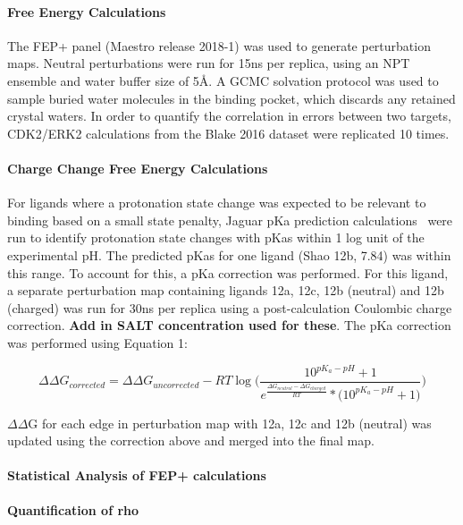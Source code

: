 \documentclass[9pt,lineno]{elife-modified} %
\begin{document}
\paragraph{Free Energy Calculations}
The FEP+ panel (Maestro release 2018-1) was used to generate perturbation maps. Neutral perturbations were run for 15ns per replica, using an NPT ensemble and water buffer size of 5\AA. A GCMC solvation protocol was used to sample buried water molecules in the binding pocket, which discards any retained crystal waters. In order to quantify the correlation in errors between two targets, CDK2/ERK2 calculations from the Blake 2016 dataset were replicated 10 times. 

\paragraph{Charge Change Free Energy Calculations} 
For ligands where a protonation state change was expected to be relevant to binding based on a small state penalty, Jaguar pKa prediction calculations~\citep{Bochevarov2013-bn} were run to identify protonation state changes with pKas within 1 log unit of the experimental pH. The predicted pKas for one ligand (Shao 12b, 7.84) was within this range. To account for this, a pKa correction was performed. For this ligand, a separate perturbation map containing ligands 12a, 12c, 12b (neutral) and 12b (charged) was run for 30ns per replica using a post-calculation Coulombic charge correction. \textbf{Add in SALT concentration used for these}. The pKa correction was performed using Equation 1: 

\begin{equation}\label{eq1}
\Delta\Delta G_{corrected} = \Delta\Delta G_{uncorrected} - RT\log\Bigg(\frac{10^{pK_a -pH}+1}{e^{\frac{\Delta G_{neutral} - \Delta G_{charged}}{RT}} * \big(10^{pK_a - pH}+1\big)}\Bigg)
\end{equation}

$\Delta\Delta$G for each edge in perturbation map with 12a, 12c and 12b (neutral) was updated using the correction above and merged into the final map. 

 
 \paragraph{Statistical Analysis of FEP+ calculations}

 
 \paragraph{Quantification of rho}
%
%
%
%
\end{document}
